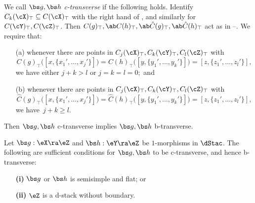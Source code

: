 \documentclass{article}
\begin{document}
\begin{dfn}
We call $\bs g,\bs h$ {\it c-transverse\/} if the following holds.
Identify $C_k(\cX)_\top\subseteq C(\cX)_\top$ with the right hand of
, and similarly for $C(\cY)_\top,C(\cZ)_\top$. Then
$C(g)_\top,\ab C(h)_\top,\ab\hat C(g)_\top,\ab\hat C(h)_\top$ act as
in --. We require that:
\begin{itemize}
\setlength{\itemsep}{0pt}
\setlength{\parsep}{0pt}
\item[(a)] whenever there are points in
$C_j(\cX)_\top,C_k(\cY)_\top,C_l(\cZ)_\top$ with
\begin{equation*}
C(g)_\top\bigl([x,\{x_1',\ldots,x_j'\}]\bigr)\!=\!
C(h)_\top\bigl([y,\{y_1',\ldots,y_k'\}]\bigr)\!=\!
[z,\{z_1',\ldots,z_l'\}],
\end{equation*}
we have either $j+k>l$ or $j=k=l=0;$ and
\item[(b)] whenever there are points in
$C_j(\cX)_\top,C_k(\cY)_\top,C_l(\cZ)_\top$ with
\begin{equation*}
\hat C(g)_\top\bigl([x,\{x_1',\ldots,x_j'\}]\bigr)\!=\!
\hat C(h)_\top\bigl([y,\{y_1',\ldots, y_k'\}]\bigr)\!=\!
[z,\{z_1',\ldots,z_l'\}],
\end{equation*}
we have~$j+k\ge l$.
\end{itemize}
Then $\bs g,\bs h$ c-transverse implies $\bs g,\bs h$ b-transverse.
\label{ds13def3}
\end{dfn}

\begin{lem} Let\/ $\bs g:\eX\ra\eZ$ and\/ $\bs h:\eY\ra\eZ$ be\/
$1$-morphisms in $\dStac$. The following are sufficient conditions
for\/ $\bs g,\bs h$ to be c-transverse, and hence b-transverse:
\begin{itemize}
\setlength{\itemsep}{0pt}
\setlength{\parsep}{0pt}
\item[{\bf(i)}] $\bs g$ or $\bs h$ is semisimple and flat; or
\item[{\bf(ii)}] $\eZ$ is a d-stack without boundary.
\end{itemize}
\label{ds13lem}
\end{lem}
\end{document}
